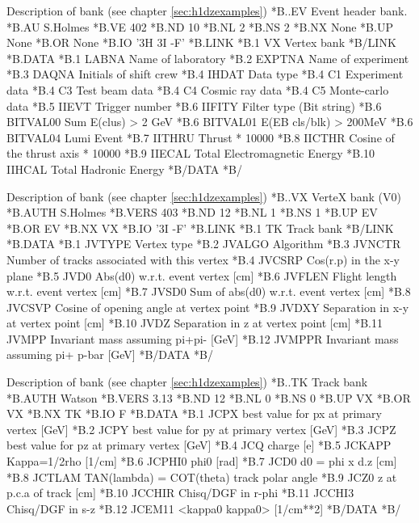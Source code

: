 \newpage

\begin{XMPt}{Description of  bank (see chapter \ref{sec:h1dzexamples})}
*B..EV  Event header bank.
*B.AU    S.Holmes
*B.VE    402
*B.ND    10
*B.NL    2
*B.NS    2
*B.NX    None
*B.UP    None
*B.OR    None
*B.IO    '3H 3I -F'
*B.LINK
*B.1   VX       Vertex bank
*B/LINK
*B.DATA
*B.1   LABNA     Name of laboratory
*B.2   EXPTNA    Name of experiment
*B.3   DAQNA     Initials of shift crew 
*B.4   IHDAT     Data type
*B.4   C1        Experiment data
*B.4   C3        Test beam data
*B.4   C4        Cosmic ray data
*B.4   C5        Monte-carlo data
*B.5   IIEVT     Trigger number
*B.6   IIFITY    Filter type (Bit string)
*B.6   BITVAL00  Sum E(clus) > 2 GeV
*B.6   BITVAL01  E(EB cls/blk) > 200MeV
*B.6   BITVAL04  Lumi Event
*B.7   IITHRU    Thrust * 10000
*B.8   IICTHR    Cosine of the thrust axis * 10000
*B.9   IIECAL    Total Electromagnetic Energy
*B.10  IIHCAL    Total Hadronic Energy
*B/DATA
*B/
\end{XMPt}

\begin{XMPt}{Description of  bank (see chapter \ref{sec:h1dzexamples})}
*B..VX     VerteX bank (V0)
*B.AUTH    S.Holmes 
*B.VERS    403
*B.ND      12
*B.NL      1
*B.NS      1
*B.UP      EV
*B.OR      EV
*B.NX      VX
*B.IO      '3I -F'
*B.LINK
*B.1   TK       Track bank
*B/LINK
*B.DATA
*B.1   JVTYPE   Vertex type
*B.2   JVALGO   Algorithm
*B.3   JVNCTR   Number of tracks associated with this vertex
*B.4   JVCSRP   Cos(r.p) in the x-y plane
*B.5   JVD0     Abs(d0) w.r.t. event vertex            [cm]
*B.6   JVFLEN   Flight length w.r.t. event vertex      [cm]
*B.7   JVSD0    Sum of abs(d0) w.r.t. event vertex     [cm]
*B.8   JVCSVP   Cosine of opening angle at vertex point
*B.9   JVDXY    Separation in x-y at vertex point      [cm]
*B.10  JVDZ     Separation in z at vertex point        [cm]
*B.11  JVMPP    Invariant mass assuming pi+pi-        [GeV]
*B.12  JVMPPR   Invariant mass assuming pi+ p-bar     [GeV]
*B/DATA
*B/
\end{XMPt}

\newpage

\begin{XMPt}{Description of  bank (see chapter \ref{sec:h1dzexamples})}
*B..TK     Track bank
*B.AUTH    Watson
*B.VERS    3.13
*B.ND      12
*B.NL      0
*B.NS      0
*B.UP      VX
*B.OR      VX
*B.NX      TK
*B.IO      F
*B.DATA
*B.1      JCPX       best value for px at primary vertex    [GeV]
*B.2      JCPY       best value for py at primary vertex    [GeV]
*B.3      JCPZ       best value for pz at primary vertex    [GeV]
*B.4      JCQ        charge                                 [e]
*B.5      JCKAPP     Kappa=1/2rho                           [1/cm]
*B.6      JCPHI0     phi0                                   [rad]
*B.7      JCD0       d0 = phi x d.z                         [cm]
*B.8      JCTLAM     TAN(lambda) = COT(theta) track polar angle
*B.9      JCZ0       z at p.c.a of track                    [cm]
*B.10     JCCHIR     Chisq/DGF in r-phi
*B.11     JCCHI3     Chisq/DGF in s-z
*B.12     JCEM11     <kappa0 kappa0>                    [1/cm**2]
*B/DATA
*B/
\end{XMPt}

